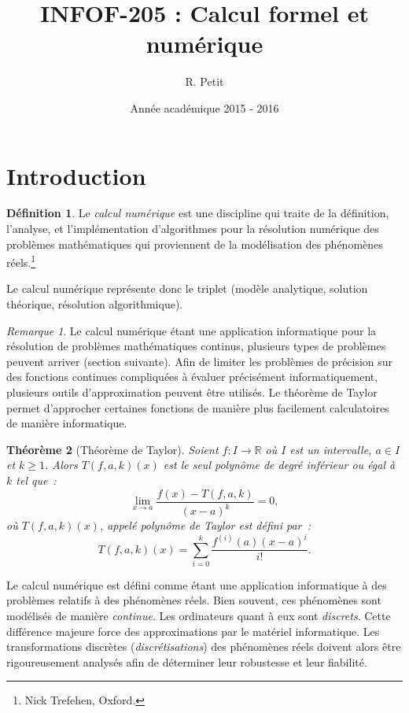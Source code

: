 \documentclass{article}
\author{R. Petit}
\date{Année académique 2015 - 2016}
\title{INFOF-205 : Calcul formel et numérique}
\newtheorem{thm}{Théorème}[section]
\theoremstyle{definition}
\newtheorem{déf}[thm]{Définition}
\theoremstyle{remark}
\newtheorem*{rmq}{Remarque}
\newcommand{\R}{\mathbb R}
\begin{document}
\maketitle
\tableofcontents
\newpage
{}

\section{Introduction}
	\begin{déf} Le \emph{calcul numérique} est une discipline qui traite de la définition, l'analyse, et l'implémentation d'algorithmes pour la résolution
	numérique des problèmes mathématiques qui proviennent de la modélisation des phénomènes réels.\footnote{Nick Trefehen, Oxford.}
	\end{déf}

	Le calcul numérique représente donc le triplet (modèle analytique, solution théorique, résolution algorithmique).

	\begin{rmq} Le calcul numérique étant une application informatique pour la résolution de problèmes mathématiques continus, plusieurs types de problèmes
	peuvent arriver (section suivante). Afin de limiter les problèmes de précision sur des fonctions continues compliquées à évaluer précisément informatiquement,
	plusieurs outils d'approximation peuvent être utilisés. Le théorème de Taylor permet d'approcher certaines fonctions de manière plus facilement calculatoires
	de manière informatique.
	\end{rmq}

	\begin{thm}[Théorème de Taylor]\label{thm:Taylor} Soient $f : I \to \R$ où $I$ est un intervalle, $a \in I$ et $k \geq 1$. Alors $T(f, a, k)(x)$ est le seul
	polynôme de degré inférieur ou égal à $k$ tel que~:
	\[\lim_{x \to a}\frac {f(x)-T(f, a, k)}{(x-a)^k} = 0,\]
	où $T(f, a, k)(x)$, appelé \emph{polynôme de Taylor} est défini par~:
	\[T(f, a, k)(x) = \sum_{i=0}^k\frac {f^{(i)}(a)(x-a)^i}{i!}.\]
	\end{thm}

	Le calcul numérique est défini comme étant une application informatique à des problèmes relatifs à des phénomènes réels. Bien souvent, ces phénomènes
	sont modélisés de manière \emph{continue}. Les ordinateurs quant à eux sont \emph{discrets}. Cette différence majeure force des approximations par le matériel
	informatique. Les transformations discrètes (\emph{discrétisations}) des phénomènes réels doivent alors être rigoureusement analysés afin de déterminer leur
	robustesse et leur fiabilité.
\end{document}
